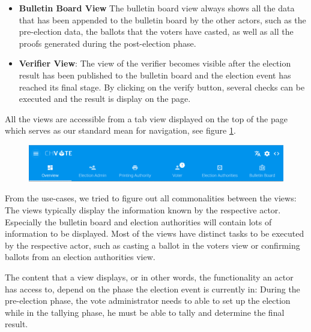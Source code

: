 \begin{itemize}
	\item \textbf{Bulletin Board View} The bulletin board view always shows all the data that has been appended to the bulletin board by the other actors, such as the pre-election data, the ballots that the voters have casted, as well as all the proofs generated during the post-election phase.

	\item \textbf{Verifier View}: The view of the verifier becomes visible after the election result has been published to the bulletin board and the election event has reached its final stage. By clicking on the verify button, several checks can be executed and the result is display on the page.
\end{itemize}

All the views are accessible from a tab view displayed on the top of the page which serves as our standard mean for navigation, see figure \ref{Navigation}.

\begin{figure}[p]
\begin{center}
\includegraphics[scale=0.44]{assets/screenshots/navigation.png}
\label{Navigation}%
\end{center}
\end{figure}

From the use-cases, we tried to figure out all commonalities between the views: The views typically display the information known by the respective actor. Especially the bulletin board and election authorities will contain lots of information to be displayed. Most of the views have distinct tasks to be executed by the respective actor, such as casting a ballot in the voters view or confirming ballots from an election authorities view.

The content that a view displays, or in other words, the functionality an actor has access to, depend on the phase the election event is currently in: During the pre-election phase, the vote administrator needs to able to set up the election while in the tallying phase, he must be able to tally and determine the final result.


